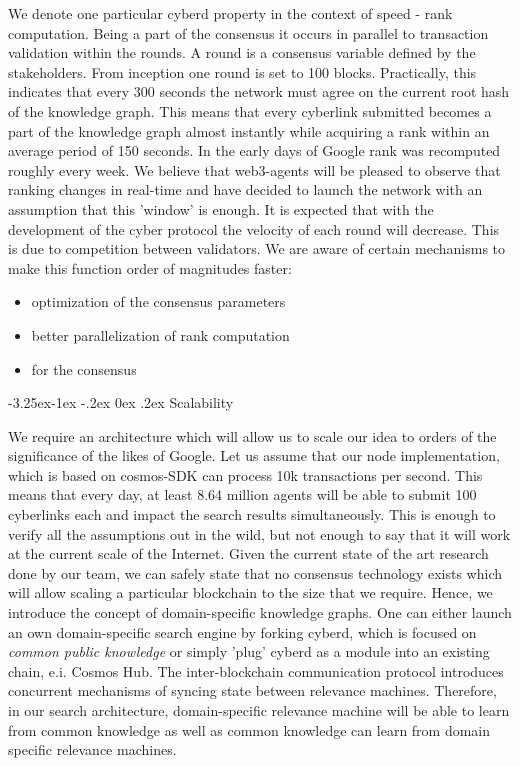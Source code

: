 \documentclass[8pt,oneside]{amsart}
\makeatletter
\newcommand{\linkred}[2]{\href{#1}{\color{red}{#2}}}
\renewcommand\subsection{\@startsection{subsection}{2}{\z@}%
                                     {-3.25ex\@plus -1ex \@minus -.2ex}%
                                     {0ex \@plus .2ex}%
                                     {\play\Large}}%
\newcommand{\titleSection}[1]{\subsection{#1}}
\newcommand{\code}[1]{{\PlayBold #1}}
\makeatother
\begin{document}
\begin{Abstract}
We denote one particular cyberd property in the context of speed - rank computation. Being a part of the consensus it occurs in parallel to transaction validation within the rounds. A round is a consensus variable defined by the stakeholders. From inception one round is set to 100 blocks. Practically, this indicates that every 300 seconds the network must agree on the current root hash of the knowledge graph. This means that every cyberlink submitted becomes a part of the knowledge graph almost instantly while acquiring a rank within an average period of 150 seconds. In the early days of Google rank was recomputed roughly every week. We believe that web3-agents will be pleased to observe that ranking changes in real-time and have decided to launch the network with an assumption that this 'window' is enough. It is expected that with the development of the cyber protocol the velocity of each round will decrease. This is due to competition between validators. We are aware of certain mechanisms to make this function order of magnitudes faster:

\begin{itemize}
\item optimization of the consensus parameters
\item better parallelization of rank computation
\item \linkred{https://medium.com/solana-labs/proof-of-history-a-clock-for-blockchain-cf47a61a9274}{a better clock} for the consensus
\end{itemize}

\titleSection{Scalability}\label{Scalability}

We require an architecture which will allow us to scale our idea to orders of the significance of the likes of Google. Let us assume that our node implementation, which is based on \code{cosmos-SDK} can process 10k transactions per second. This means that every day, at least 8.64 million agents will be able to submit 100 cyberlinks each and impact the search results simultaneously. This is enough to verify all the assumptions out in the wild, but not enough to say that it will work at the current scale of the Internet. Given the current state of the art research done by our team, we can safely state that no consensus technology exists which will allow scaling a particular blockchain to the size that we require. Hence, we introduce the concept of domain-specific knowledge graphs. One can either launch an own domain-specific search engine by forking cyberd, which is focused on \textit{common public knowledge} or simply 'plug' cyberd as a module into an existing chain, e.i. Cosmos Hub. The inter-blockchain communication protocol introduces concurrent mechanisms of syncing state between relevance machines. Therefore, in our search architecture, domain-specific relevance machine will be able to learn from common knowledge as well as common knowledge can learn from domain specific relevance machines.


\end{Abstract}
\end{document}
